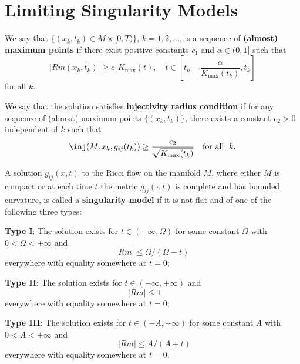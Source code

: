 \section{Limiting Singularity Models}
\begin{definition}
  \label{def:cz-almost-maximum-curvature-points}
We say that $\{(x_k,t_k) \in M\times [0,T) \}$, $k=1, 2, \ldots$,
is a sequence of {\bf (almost) maximum points} if there exist positive constants $c_1$ and
$\alpha \in (0,1]$ such that
$$
|Rm(x_k,t_k)|\geq c_1 K_{\max}(t), \quad t\in
[t_k-\frac{\alpha}{K_{\max}(t_k)},t_k]
$$
for all $k$.
\end{definition}
\begin{definition}
  \label{def:cz-injectivity-radius-condition-at-almost-maximum-points}
We say that the solution satisfies {\bf injectivity radius
condition} if for any sequence
of (almost) maximum points $\{(x_k,t_k)\}$, there exists a
constant $c_2>0$ independent of $k$ such that
$$
\inj(M,x_k,g_{ij}(t_k))\geq \frac{c_2}{\sqrt{K_{\max}(t_k)}} \quad
\text{for all }\;   k.
$$
\end{definition}
\begin{definition}
  \label{def:cz-singularity-types-for-maximal-ricci-flows}
A solution $g_{ij}(x,t)$ to the Ricci flow on the manifold $M$,
where either $M$ is compact or at each time $t$ the metric
$g_{ij}(\cdot,t)$ is complete and has bounded curvature, is called
a {\bf singularity model} if it is not
flat and of one of the following three types:

\vskip 0.1cm\noindent \textbf{Type I}: The solution
exists for $t\in(-\infty,\Omega)$ for some constant $\Omega$ with
$0<\Omega<+\infty$ and
$$
|Rm|\leq\Omega/(\Omega-t)
$$
everywhere with equality somewhere at $t=0$;

\vskip 0.1cm\noindent \textbf{Type II}: The
solution exists for $t\in(-\infty,+\infty)$  and
$$
|Rm|\leq 1 \ \ \ \ \ \ \ \ \
$$
everywhere with equality somewhere at $t=0$;

\vskip 0.1cm\noindent \textbf{Type III}: The
solution exists for $t\in(-A,+\infty)$ for some constant $A$ with
$0<A<+\infty$ and
$$
\ \ |Rm|\leq A/(A+t)
$$
everywhere with equality somewhere at $t=0$.
\end{definition}
